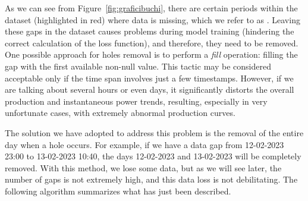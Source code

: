 As we can see from Figure~\ref{fig:graficibuchi}, there are certain
periods within the dataset (highlighted in red) where data is missing,
which we refer to as . Leaving these gaps in the
dataset causes problems during model training
(hindering the correct calculation of the loss function), and therefore,
they need to be removed. One possible approach for holes removal
is to perform a \textit{fill} operation: filling the gap with the
first available non-null value. This tactic may be considered
acceptable only if the time span involves just a few timestamps.
However, if we are talking about several hours or even days, it
significantly distorts the overall production and instantaneous
power trends, resulting, especially in very unfortunate cases, with extremely abnormal production curves.

The solution we have adopted to address this problem is the removal of
the entire day when a hole occurs. For example, if we have a data
gap from 12-02-2023 23:00 to 13-02-2023 10:40, the days
12-02-2023 and 13-02-2023 will be completely removed. With this
method, we lose some data, but as we will see later, the number of
gaps is not extremely high, and this data loss is not
debilitating. The following algorithm summarizes what has
just been described.

